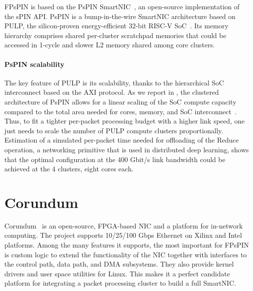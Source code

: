 FPsPIN is based on the PsPIN SmartNIC~\cite{di2021risc}, an open-source implementation of the sPIN API. PsPIN is a bump-in-the-wire SmartNIC architecture based on PULP, the silicon-proven energy-efficient 32-bit RISC-V SoC~\cite{rossi2015pulp}. Its memory hierarchy comprises shared per-cluster scratchpad memories that could be accessed in 1-cycle and slower L2 memory shared among core clusters.

\paragraph{PsPIN scalability} The key feature of PULP is its scalability, thanks to the hierarchical SoC interconnect based on the AXI protocol. As we report in , the clustered architecture of PsPIN allows for a linear scaling of the SoC compute capacity compared to the total area needed for cores, memory, and SoC interconnect~\cite{di2021risc}. Thus, to fit a tighter per-packet processing budget with a higher link speed, one just needs to scale the number of PULP compute clusters proportionally. Estimation of a simulated per-packet time needed for offloading of the Reduce operation, a networking primitive that is used in distributed deep learning, shows that the optimal configuration at the 400 Gbit/s link bandwidth could be achieved at the 4 clusters, eight cores each.

\section{Corundum} \label{sec:background-corundum}

Corundum~\cite{forencich2020fccm} is an open-source, FPGA-based NIC and a platform for in-network computing.  The project supports 10/25/100 Gbps Ethernet on Xilinx and Intel platforms.  Among the many features it supports, the most important for FPsPIN is custom logic to extend the functionality of the NIC together with interfaces to the control path, data path, and DMA subsystems.  They also provide kernel drivers and user space utilities for Linux.  This makes it a perfect candidate platform for integrating a packet processing cluster to build a full SmartNIC.



